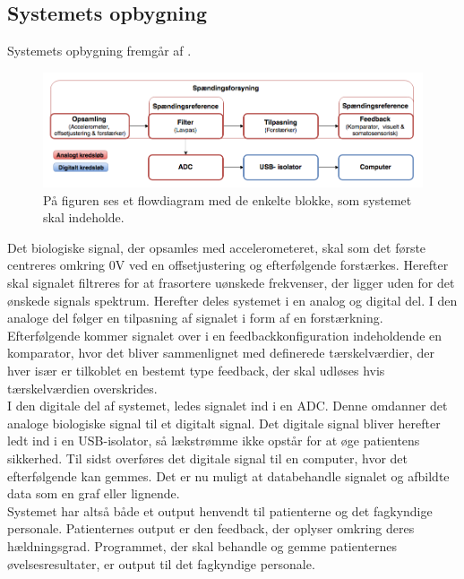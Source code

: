 \subsection{Systemets opbygning}\label{ref:blokdiagram}
Systemets opbygning fremgår af .

\begin{figure}[H]
	\centering
	\includegraphics[scale=0.7]{figures/cProblemloesning/blokdiagram.PNG}
	\caption{På figuren ses et flowdiagram med de enkelte blokke, som systemet skal indeholde.}
	\label{kravblok}
\end{figure}
Det biologiske signal, der opsamles med accelerometeret, skal som det første centreres omkring $0$V ved en offsetjustering og efterfølgende forstærkes. Herefter skal signalet filtreres for at frasortere uønskede frekvenser, der ligger uden for det ønskede signals spektrum. Herefter deles systemet i en analog og digital del. I den analoge del følger en tilpasning af signalet i form af en forstærkning. Efterfølgende kommer signalet over i en feedbackkonfiguration indeholdende en komparator, hvor det bliver sammenlignet med definerede tærskelværdier, der hver især er tilkoblet en bestemt type feedback, der skal udløses hvis tærskelværdien overskrides. \\
I den digitale del af systemet, ledes signalet ind i en ADC. Denne omdanner det analoge biologiske signal til et digitalt signal. Det digitale signal bliver herefter ledt ind i en USB-isolator, så lækstrømme ikke opstår for at øge patientens sikkerhed. Til sidst overføres det digitale signal til en computer, hvor det efterfølgende kan gemmes. Det er nu muligt at databehandle signalet og afbildte data som en graf eller lignende. \\
Systemet har altså både et output henvendt til patienterne og det fagkyndige personale. Patienternes output er den feedback, der oplyser omkring deres hældningsgrad. Programmet, der skal behandle og gemme patienternes øvelsesresultater, er output til det fagkyndige personale.

